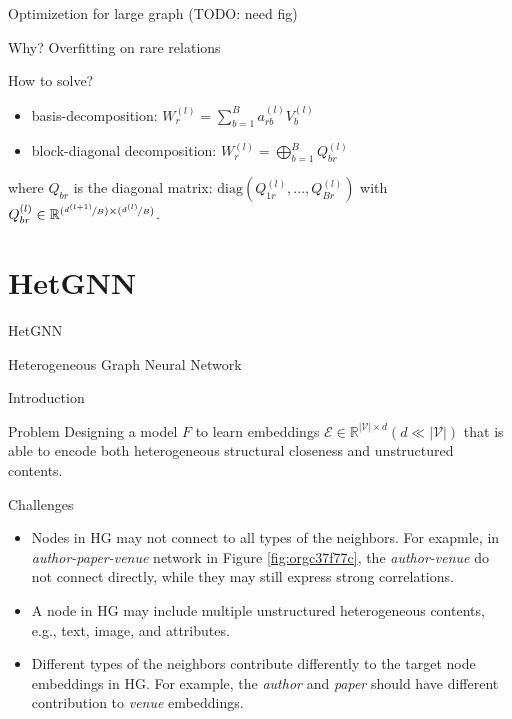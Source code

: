 \documentclass[aspectratio=1610,xcolor={dvipsnames},hyperref={colorlinks,unicode,linkcolor=violet,anchorcolor=blueviolet,citecolor=YellowOrange,filecolor=black,urlcolor=Aquamarine}]{beamer}
\begin{document}
\begin{frame}[label={sec:orga948bbb}]{Optimizetion for large graph (TODO: need fig)}
\begin{block}{Why?}
Overfitting on rare relations
\end{block}

\begin{block}{How to solve?}
\begin{itemize}
\item basis-decomposition: \(W_{r}^{(l)}=\sum_{b=1}^{B} a_{r b}^{(l)} V_{b}^{(l)}\)

\item block-diagonal decomposition: \(W_{r}^{(l)}=\bigoplus_{b=1}^{B} Q_{b r}^{(l)}\)
\end{itemize}

where \(Q_{b r}\) is the diagonal matrix:
\(\mathrm{diag}(Q_{1r}^{(l)},...,Q_{Br}^{(l)})\) with \(Q_{br}^{(l)} \in
\mathbb{R}^{(\nicefrac{d^{(l+1)}}{B}) \times
(\nicefrac{d^{(l)}}{B})}\).
\end{block}
\end{frame}

\section{HetGNN}
\label{sec:org853f1ac}

\begin{frame}[label={sec:orgfbf4b5b}]{HetGNN}
\begin{center}
\Huge Heterogeneous Graph Neural Network
\end{center}

\textcite{zhangHeterogeneousGraphNeural2019}
\end{frame}

\begin{frame}[allowframebreaks]{Introduction}
\begin{block}{Problem}
Designing a model \(F\) to learn embeddings \(\mathcal{E} \in
\mathbb{R}^{|\mathcal{V}| \times d}(d \ll |\mathcal{V}|)\) that is
able to encode both heterogeneous structural closeness and
unstructured contents.
\end{block}

\begin{block}{Challenges}
\begin{itemize}
\item Nodes in HG may not connect to all types of the neighbors. For
exapmle, in \emph{author-paper-venue} network in Figure \ref{fig:orgc37f77c}, the
\emph{author-venue} do not connect directly, while they may still
express strong correlations.
\item A node in HG may include multiple unstructured heterogeneous
contents, e.g., text, image, and attributes.
\item Different types of the neighbors contribute differently to the
target node embeddings in HG.  For example, the \emph{author} and
\emph{paper} should have different contribution to \emph{venue}
embeddings.
\end{itemize}
\end{block}
\end{frame}
\end{document}
